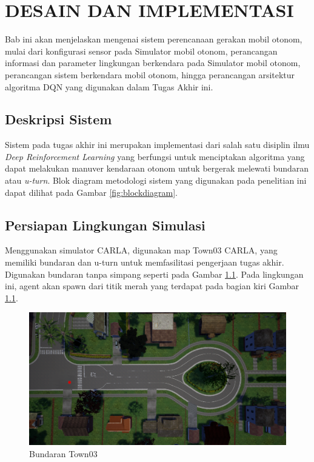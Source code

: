 \chapter{DESAIN DAN IMPLEMENTASI}
\label{chap:desainimplementasi}

Bab ini akan menjelaskan mengenai sistem perencanaan gerakan mobil otonom, mulai dari konfigurasi sensor pada Simulator mobil otonom, perancangan informasi dan parameter lingkungan berkendara pada Simulator mobil otonom, perancangan sistem berkendara mobil otonom, hingga perancangan arsitektur algoritma DQN yang digunakan dalam Tugas Akhir ini.


\section{Deskripsi Sistem}
\label{sec:deskripsisistem}

Sistem pada tugas akhir ini merupakan implementasi dari salah satu disiplin ilmu \textit{Deep Reinforcement Learning} yang berfungsi untuk menciptakan algoritma yang dapat melakukan manuver kendaraan otonom untuk bergerak melewati bundaran atau \textit{u-turn}. Blok diagram metodologi sistem yang digunakan pada penelitian ini dapat dilihat pada Gambar \ref{fig:blockdiagram}.

\section{Persiapan Lingkungan Simulasi}
\label{sec:simulasi}
Menggunakan simulator CARLA, digunakan map Town03 CARLA, yang memiliki bundaran dan u-turn untuk memfasilitasi pengerjaan tugas akhir. Digunakan bundaran tanpa simpang seperti pada Gambar  \ref{fig:bundaran_town03}. Pada lingkungan ini, agent akan spawn dari titik merah yang terdapat pada bagian kiri Gambar \ref{fig:bundaran_town03}.
\begin{figure}[H] 
	\centering
	\includegraphics[width=.7\linewidth]{images/spawn_point_dot}
	\caption{Bundaran Town03}
	\label{fig:bundaran_town03}
\end{figure}

